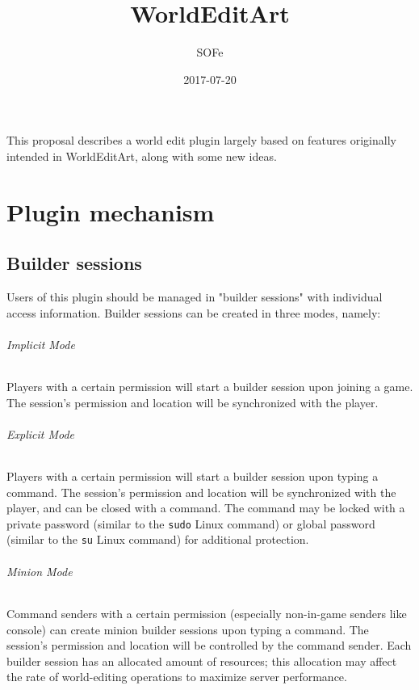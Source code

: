 \documentclass{article}
\title{WorldEditArt}
\date{2017-07-20}
\author{SOFe}
\begin{document}
	\maketitle

	This proposal describes a world edit plugin largely based on features originally intended in WorldEditArt, along with
	some new ideas.

	\part{Plugin mechanism}
		\chapter{Builder sessions}
			Users of this plugin should be managed in "builder sessions" with individual access information. Builder
			sessions can be created in three modes, namely:
			\paragraph{Implicit Mode}
				Players with a certain permission will start a builder session upon joining a game. The session's permission
				and location will be synchronized with the player.
			\paragraph{Explicit Mode}
				Players with a certain permission will start a builder session upon typing a command. The session's
				permission and location will be synchronized with the player, and can be closed with a command. The command
				may be locked with a private password (similar to the \texttt{sudo} Linux command) or global password
				(similar to the \texttt{su} Linux command) for additional protection.
			\paragraph{Minion Mode}
				Command senders with a certain permission (especially non-in-game senders like console) can create minion
				builder sessions upon typing a command. The session's permission and location will be controlled by the
				command sender.
			Each builder session has an allocated amount of resources; this allocation may affect the rate of world-editing
			operations to maximize server performance.
\end{document}
